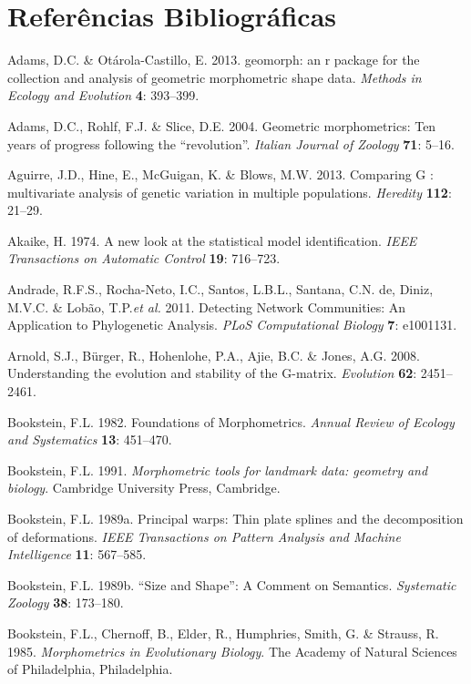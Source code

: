 \documentclass[11pt,twoside]{report}
\begin{document}

\pagestyle{plain}

\chapter*{Referências Bibliográficas}


Adams, D.C. \& Otárola-Castillo, E. 2013. geomorph: an r package for the
collection and analysis of geometric morphometric shape data.
\emph{Methods in Ecology and Evolution} \textbf{4}: 393--399.

Adams, D.C., Rohlf, F.J. \& Slice, D.E. 2004. Geometric morphometrics:
Ten years of progress following the ``revolution''. \emph{Italian
Journal of Zoology} \textbf{71}: 5--16.

Aguirre, J.D., Hine, E., McGuigan, K. \& Blows, M.W. 2013. Comparing G :
multivariate analysis of genetic variation in multiple populations.
\emph{Heredity} \textbf{112}: 21--29.

Akaike, H. 1974. A new look at the statistical model identification.
\emph{IEEE Transactions on Automatic Control} \textbf{19}: 716--723.

Andrade, R.F.S., Rocha-Neto, I.C., Santos, L.B.L., Santana, C.N. de,
Diniz, M.V.C. \& Lobão, T.P.\emph{et al.} 2011. Detecting Network
Communities: An Application to Phylogenetic Analysis. \emph{PLoS
Computational Biology} \textbf{7}: e1001131.

Arnold, S.J., Bürger, R., Hohenlohe, P.A., Ajie, B.C. \& Jones, A.G.
2008. Understanding the evolution and stability of the G-matrix.
\emph{Evolution} \textbf{62}: 2451--2461.

Bookstein, F.L. 1982. Foundations of Morphometrics. \emph{Annual Review
of Ecology and Systematics} \textbf{13}: 451--470.

Bookstein, F.L. 1991. \emph{Morphometric tools for landmark data:
geometry and biology}. Cambridge University Press, Cambridge.

Bookstein, F.L. 1989a. Principal warps: Thin plate splines and the
decomposition of deformations. \emph{IEEE Transactions on Pattern
Analysis and Machine Intelligence} \textbf{11}: 567--585.

Bookstein, F.L. 1989b. ``Size and Shape'': A Comment on Semantics.
\emph{Systematic Zoology} \textbf{38}: 173--180.

Bookstein, F.L., Chernoff, B., Elder, R., Humphries, Smith, G. \&
Strauss, R. 1985. \emph{Morphometrics in Evolutionary Biology}. The
Academy of Natural Sciences of Philadelphia, Philadelphia.
\end{document}
